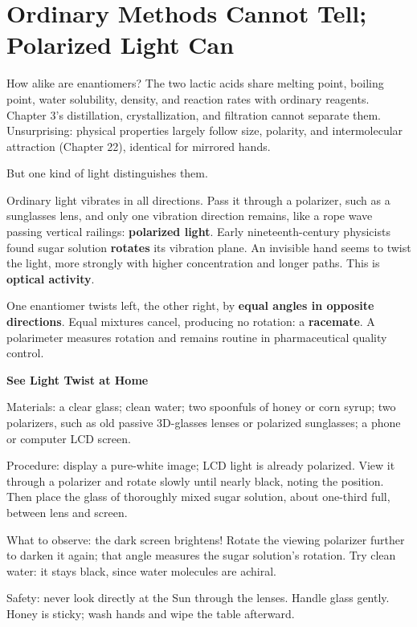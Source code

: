 \section{Ordinary Methods Cannot Tell; Polarized Light Can}

How alike are enantiomers? The two lactic acids share melting point, boiling point, water solubility, density, and reaction rates with ordinary reagents. Chapter 3's distillation, crystallization, and filtration cannot separate them. Unsurprising: physical properties largely follow size, polarity, and intermolecular attraction (Chapter 22), identical for mirrored hands.

But one kind of light distinguishes them.

Ordinary light vibrates in all directions. Pass it through a polarizer, such as a sunglasses lens, and only one vibration direction remains, like a rope wave passing vertical railings: \textbf{polarized light}. Early nineteenth-century physicists found sugar solution \textbf{rotates} its vibration plane. An invisible hand seems to twist the light, more strongly with higher concentration and longer paths. This is \textbf{optical activity}.

One enantiomer twists left, the other right, by \textbf{equal angles in opposite directions}. Equal mixtures cancel, producing no rotation: a \textbf{racemate}. A polarimeter measures rotation and remains routine in pharmaceutical quality control.

\begin{shiyan}
\textbf{See Light Twist at Home}

Materials: a clear glass; clean water; two spoonfuls of honey or corn syrup; two polarizers, such as old passive 3D-glasses lenses or polarized sunglasses; a phone or computer LCD screen.

Procedure: display a pure-white image; LCD light is already polarized. View it through a polarizer and rotate slowly until nearly black, noting the position. Then place the glass of thoroughly mixed sugar solution, about one-third full, between lens and screen.

What to observe: the dark screen brightens! Rotate the viewing polarizer further to darken it again; that angle measures the sugar solution's rotation. Try clean water: it stays black, since water molecules are achiral.

Safety: never look directly at the Sun through the lenses. Handle glass gently. Honey is sticky; wash hands and wipe the table afterward.
\end{shiyan}

